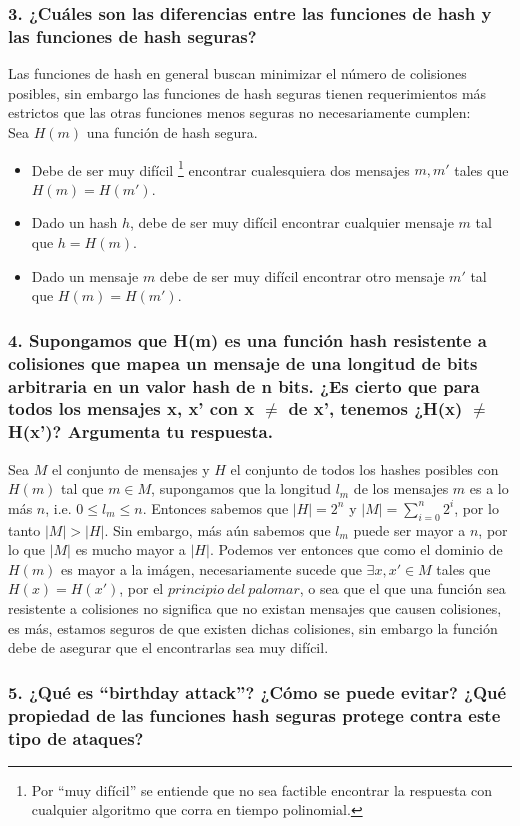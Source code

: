 \documentclass[12pt]{article}
\begin{document}
\subsubsection*{3. ¿Cuáles son las diferencias entre las funciones de hash y las funciones de hash seguras?}
Las funciones de hash en general buscan minimizar el número de colisiones posibles, sin embargo las funciones de hash seguras tienen requerimientos más estrictos que las otras funciones menos seguras no necesariamente cumplen: \\
Sea $H(m)$ una función de hash segura.
\begin{itemize}
\item Debe de ser muy difícil \footnote{Por ``muy difícil'' se entiende que no sea factible encontrar la respuesta con cualquier algoritmo que corra en tiempo polinomial.} encontrar cualesquiera dos mensajes $m, m'$ tales que $H(m) = H(m')$.
\item Dado un hash $h$, debe de ser muy difícil encontrar cualquier mensaje $m$ tal que $h = H(m)$.
\item Dado un mensaje $m$ debe de ser muy difícil encontrar otro mensaje $m'$ tal que $H(m) = H(m')$.
\end{itemize}

\subsubsection*{4. Supongamos que H(m) es una función hash resistente a colisiones que mapea un mensaje de una longitud de bits arbitraria en un valor hash de n bits. ¿Es cierto que para todos los mensajes x, x’ con x $\neq$ de x’, tenemos ¿H(x) $\neq$ H(x')? Argumenta tu respuesta.}
Sea $M$ el conjunto de mensajes y $H$ el conjunto de todos los hashes posibles con $H(m)$ tal que $m \in M$, supongamos que la longitud $l_m$ de los mensajes $m$ es a lo más $n$, i.e. $0 \leq l_m \leq n$. Entonces sabemos que $|H| = 2^n$ y $|M| = \sum_{i = 0}^n 2^i$, por lo tanto $|M| > |H|$. Sin embargo, más aún sabemos que $l_m$ puede ser mayor a $n$, por lo que $|M|$ es mucho mayor a $|H|$. Podemos ver entonces que como el dominio de $H(m)$ es mayor a la imágen, necesariamente sucede que $\exists x, x' \in M$ tales que $H(x) = H(x')$, por el $principio\ del\ palomar$, o sea que el que una función sea resistente a colisiones no significa que no existan mensajes que causen colisiones, es más, estamos seguros de que existen dichas colisiones, sin embargo la función debe de asegurar que el encontrarlas sea muy difícil.

\subsubsection*{5. ¿Qué es “birthday attack”? ¿Cómo se puede evitar? ¿Qué propiedad de las funciones hash seguras protege contra este tipo de ataques?}
\end{document}
